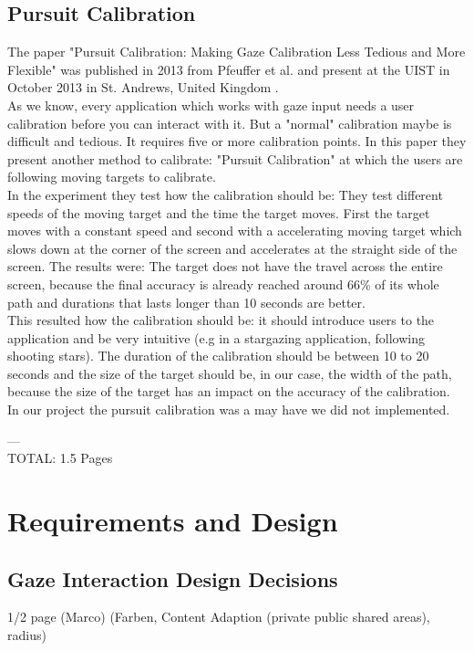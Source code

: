 \documentclass{sigchi}
\begin{document}
\subsection{Pursuit Calibration}
The paper "Pursuit Calibration: Making Gaze Calibration Less Tedious and More Flexible" was published in 2013 from Pfeuffer et al. and present at the UIST in October 2013 in St. Andrews, United Kingdom \cite{pfeuffer2013pursuit}.\\
As we know, every application which works with gaze input needs a user calibration before you can interact with it. But a "normal" calibration maybe is difficult and tedious. It requires five or more calibration points. In this paper they present another method to calibrate: "Pursuit Calibration" at which the users are following moving targets to calibrate.\\
In the experiment they test how the calibration should be: They test different speeds of the moving target and the time the target moves. First the target moves with a constant speed and second with a accelerating moving target which slows down at the corner of the screen and accelerates at the straight side of the screen. The results were: The target does not have the travel across the entire screen, because the final accuracy is already reached around 66\% of its whole path and durations that lasts longer than 10 seconds are better.\\
This resulted how the calibration should be: it should introduce users to the application and be very intuitive (e.g in a stargazing application, following shooting stars). The duration of the calibration should be between 10 to 20 seconds and the size of the target should be, in our case, the width of the path, because the size of the target has an impact on the accuracy of the calibration.\\
In our project the pursuit calibration was a may have we did not implemented.

---\\
TOTAL: 1.5 Pages

\section{Requirements and Design}
\subsection{Gaze Interaction Design Decisions}
1/2 page (Marco) (Farben, Content Adaption (private public shared areas), radius)
\end{document}
